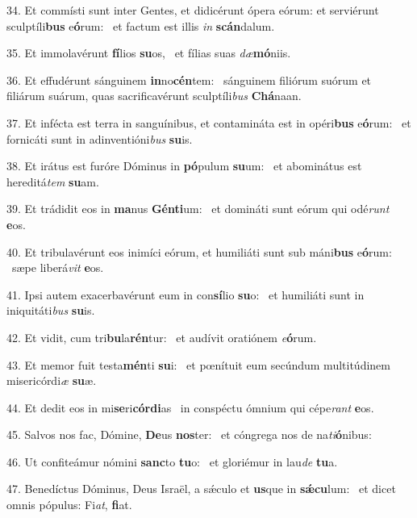 34. Et commísti sunt inter Gentes, et didicérunt ópera eórum: et serviérunt sculptíli\textbf{bus} e\textbf{ó}rum: \ast\  et factum est illis \textit{in} \textbf{scán}dalum.\

35. Et immolavérunt \textbf{fí}lios \textbf{su}os, \ast\  et fílias suas \textit{dæ}\textbf{mó}niis.\

36. Et effudérunt sánguinem \textbf{in}no\textbf{cén}tem: \ast\  sánguinem filiórum suórum et filiárum suárum, quas sacrificavérunt sculptíli\textit{bus} \textbf{Chá}naan.\

37. Et infécta est terra in sanguínibus, et contamináta est in opéri\textbf{bus} e\textbf{ó}rum: \ast\  et fornicáti sunt in adinventióni\textit{bus} \textbf{su}is.\

38. Et irátus est furóre Dóminus in \textbf{pó}pulum \textbf{su}um: \ast\  et abominátus est hereditá\textit{tem} \textbf{su}am.\

39. Et trádidit eos in \textbf{ma}nus \textbf{Gén}\textbf{ti}um: \ast\  et domináti sunt eórum qui odé\textit{runt} \textbf{e}os.\

40. Et tribulavérunt eos inimíci eórum, et humiliáti sunt sub máni\textbf{bus} e\textbf{ó}rum: \ast\  sæpe liberá\textit{vit} \textbf{e}os.\

41. Ipsi autem exacerbavérunt eum in con\textbf{sí}lio \textbf{su}o: \ast\  et humiliáti sunt in iniquitáti\textit{bus} \textbf{su}is.\

42. Et vidit, cum tri\textbf{bu}la\textbf{rén}tur: \ast\  et audívit oratiónem \textit{e}\textbf{ó}rum.\

43. Et memor fuit testa\textbf{mén}ti \textbf{su}i: \ast\  et pœnítuit eum secúndum multitúdinem misericórdi\textit{æ} \textbf{su}æ.\

44. Et dedit eos in mi\textbf{se}ri\textbf{cór}\textbf{di}as \ast\  in conspéctu ómnium qui cépe\textit{rant} \textbf{e}os.\

45. Salvos nos fac, Dómine, \textbf{De}us \textbf{nos}ter: \ast\  et cóngrega nos de na\textit{ti}\textbf{ó}nibus:\

46. Ut confiteámur nómini \textbf{sanc}to \textbf{tu}o: \ast\  et gloriémur in lau\textit{de} \textbf{tu}a.\

47. Benedíctus Dóminus, Deus Israël, a sǽculo et \textbf{us}que in \textbf{sǽ}\textbf{cu}lum: \ast\  et dicet omnis pópulus: Fi\textit{at}, \textbf{fi}at.\

